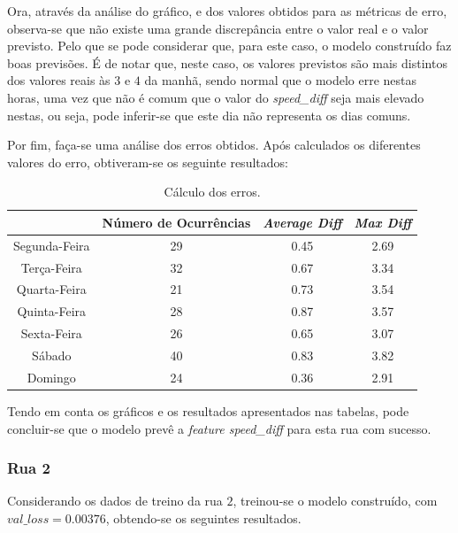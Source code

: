 \documentclass[a4paper, 12pt]{article}
\begin{document}
Ora, através da análise do gráfico, e dos valores obtidos para as métricas de erro, observa-se que não existe uma grande discrepância entre o valor real e o valor previsto. Pelo que se pode considerar que, para este caso, o modelo construído faz boas previsões. É de notar que, neste caso, os valores previstos são mais distintos dos valores reais às $3$ e $4$ da manhã, sendo normal que o modelo erre nestas horas, uma vez que não é comum que o valor do \textit{speed\_diff} seja mais elevado nestas, ou seja, pode inferir-se que este dia não representa os dias comuns.


Por fim, faça-se uma análise dos erros obtidos. Após calculados os diferentes valores do erro, obtiveram-se os seguinte resultados:

\begin{table}[H]
\centering
\begin{tabular}{||c||c|c|c||}
	\hline\hline
	 & Número de Ocurrências & \textit{Average Diff} & \textit{Max Diff} \\
	\hline\hline
	Segunda-Feira & 29&
	0.45
 & 2.69\\
	\hline
	 Terça-Feira  &32&
	0.67
 & 3.34\\
	\hline
	 Quarta-Feira & 21&
	0.73
 & 3.54
 \\
	\hline
	 Quinta-Feira  & 28&
	0.87
 & 3.57
   \\
	\hline
	 Sexta-Feira & 26&
	0.65 & 3.07
 \\
	\hline
	 Sábado  & 40&
	0.83 & 3.82   \\
	\hline
	 Domingo & 24&
0.36
 & 
2.91
 \\
	\hline\hline
\end{tabular}
\label{table:rua1}
\caption{Cálculo dos erros.}
\end{table}

Tendo em conta os gráficos e os resultados apresentados nas tabelas, pode concluir-se que o modelo prevê a \textit{feature speed\_diff} para esta rua com sucesso.

\subsubsection{Rua 2}

Considerando os dados de treino da rua $2$, treinou-se o modelo construído, com $val\_loss=0.00376$, obtendo-se os seguintes resultados. 
\end{document}
